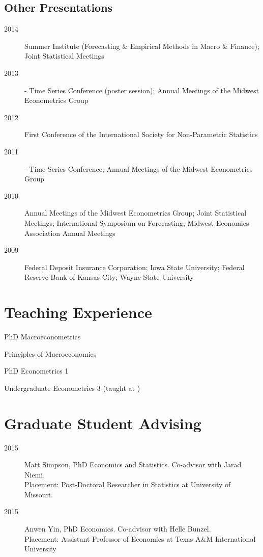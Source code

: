 \documentclass[12pt]{article}%
\newcommand{\p}{\rlap{.}}
\newcommand{\allcaps}[1]{\textls{\MakeUppercase{#1}}}
\begin{document}
\subsection*{Other Presentations}
\begin{description}
\item[2014] \allcaps{NBER} Summer Institute (Forecasting \& Empirical Methods in
  Macro \& Finance); Joint Statistical Meetings
\item[2013] \allcaps{NBER}-\allcaps{NSF} Time Series Conference
  (poster session); Annual Meetings of the Midwest Econometrics Group
\item[2012] First Conference of the International Society for
  Non-Parametric Statistics
\item[2011] \allcaps{NBER}-\allcaps{NSF} Time Series Conference;
  Annual Meetings of the Midwest Econometrics Group
\item[2010] Annual Meetings of the Midwest Econometrics Group; Joint
  Statistical Meetings; International Symposium on Forecasting;
  Midwest Economics Association Annual Meetings
\item[2009] Federal Deposit Insurance Corporation; Iowa State
  University; Federal Reserve Bank of Kansas City; Wayne State
  University
\end{description}

\section*{Teaching Experience}
\begin{description}[noitemsep]
\item[2011 -- present] PhD Macroeconometrics
\item[2010 -- present] Principles of Macroeconomics
\item[2009 -- present] PhD Econometrics 1
\item[2009\p] Undergraduate Econometrics 3 (taught at \allcaps{UCSD})
\end{description}

\section*{Graduate Student Advising}
\begin{description}
\item[2015] Matt Simpson, PhD Economics and Statistics.  Co-advisor
with Jarad Niemi. \\
Placement: Post-Doctoral Researcher in Statistics at University of Missouri.
\item[2015] Anwen Yin, PhD Economics. Co-advisor with Helle Bunzel. \\
Placement: Assistant Professor of Economics at Texas A\&M
International University
\end{description}
\end{document}
